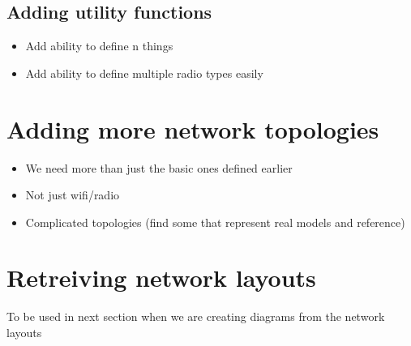 \subsection{Adding utility functions}
\begin{itemize}
    \item Add ability to define {n} things
    \item Add ability to define multiple radio types easily
\end{itemize}


\section{Adding more network topologies}
\begin{itemize}
    \item We need more than just the basic ones defined earlier
    \item Not just wifi/radio
    \item Complicated topologies (find some that represent real models and reference)
\end{itemize}


\section{Retreiving network layouts}
To be used in next section when we are creating diagrams from the network layouts
